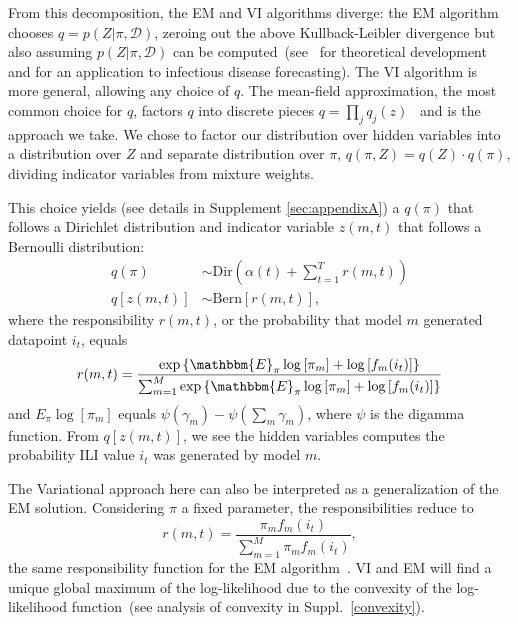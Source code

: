 \documentclass[12pt]{article}
\def\l{\left}
\def\r{\right}
\begin{document}

From this decomposition, the EM and VI algorithms diverge: the EM algorithm chooses $q = p(Z|\pi,\mathcal{D})$, zeroing out the above Kullback-Leibler divergence but also assuming $p(Z | \pi, \mathcal{D})$ can be computed~(see~\cite{bishop2006pattern} for theoretical development and \cite{reich2019collaborativepnas} for an application to infectious disease forecasting).
The VI algorithm is more general, allowing any choice of $q$.
The mean-field approximation, the most common choice for $q$, factors $q$ into discrete pieces $q = \prod_{j}q_{j}(z)$~\cite{blei2017variational,rustagi1976variational} and is the approach we take.
We chose to factor our distribution over hidden variables into a distribution over $Z$ and separate distribution over $\pi$, $q(\pi,Z) = q(Z) \cdot q(\pi)$, dividing indicator variables from mixture weights.

This choice yields (see details in Supplement \ref{sec:appendixA}) a $q(\pi)$ that follows a Dirichlet distribution and indicator variable $z(m,t)$ that follows a Bernoulli distribution:
\begin{align}
    q(\pi)  &\sim \mathrm{Dir}\l( \alpha(t) + \sum_{t=1}^{T}  r(m,t)  \r) \label{dirSol}\\
   q\l[z(m,t)\r] &\sim \mathrm{Bern}\l[ r(m,t) \r],
\end{align}
where the responsibility $r(m,t)$, or the probability that model $m$ generated datapoint $i_{t}$, equals
\begin{equation}
  r(m,t) = \dfrac{ \exp \l \{ \mathbbm{E}_{\pi} \log \l[ \pi_m \r] + \log \l[ f_{m}(i_{t}) \r] \r \} } {\sum_{m=1}^{M} \exp \l \{ \mathbbm{E}_{\pi} \log \l[ \pi_m \r] + \log \l[ f_{m}(i_{t}) \r] \r \}}
\end{equation}
and $E_{\pi}\log[\pi_m]$ equals $\psi(\gamma_{m}) - \psi\l(\sum_{m} \gamma_{m} \r)$, where $\psi$ is the digamma function.
From $q\l[z(m,t)\r]$, we see the hidden variables computes the probability ILI value $i_{t}$ was generated by model $m$.

The Variational approach here can also be interpreted as a generalization of the EM solution.
Considering $\pi$ a fixed parameter, the responsibilities reduce to
\begin{equation}
  r(m,t) = \dfrac{\pi_mf_{m}(i_{t})}{\sum_{m=1}^{M} \pi_mf_{m}(i_{t}) },
\end{equation}
the same responsibility function for the EM algorithm~\cite{reich2019collaborativepnas}.
VI and EM will find a unique global maximum of the log-likelihood due to the convexity of the log-likelihood function~(see analysis of convexity in Suppl.~\ref{convexity}).
\end{document}
